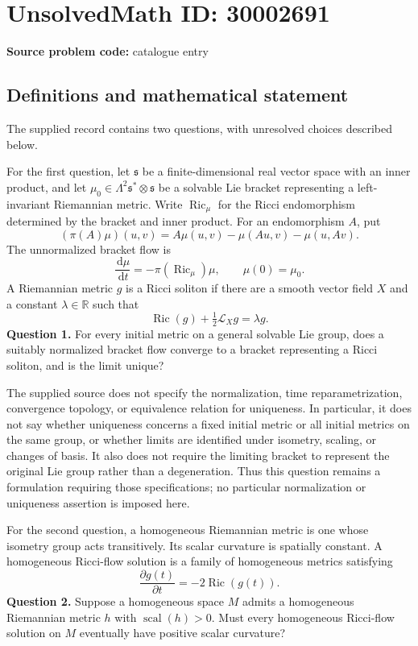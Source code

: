 \documentclass[11pt]{article}
\newcommand{\R}{\mathbb{R}}
\newcommand{\dd}{\,\mathrm{d}}
\begin{document}
\section*{UnsolvedMath ID: 30002691}
\textbf{Source problem code:} catalogue entry
\subsection{Definitions and mathematical statement}
The supplied record contains two questions, with unresolved choices described below.

For the first question, let \(\mathfrak{s}\) be a finite-dimensional real vector space with an inner product, and let \(\mu_0\in\Lambda^2\mathfrak{s}^*\otimes\mathfrak{s}\) be a solvable Lie bracket representing a left-invariant Riemannian metric. Write \(\operatorname{Ric}_{\mu}\) for the Ricci endomorphism determined by the bracket and inner product. For an endomorphism \(A\), put
\[
(\pi(A)\mu)(u,v)=A\mu(u,v)-\mu(Au,v)-\mu(u,Av).
\]
The unnormalized bracket flow is
\[
\frac{\dd\mu}{\dd t}=-\pi(\operatorname{Ric}_{\mu})\mu,
\qquad \mu(0)=\mu_0.
\]
A Riemannian metric \(g\) is a Ricci soliton if there are a smooth vector field \(X\) and a constant \(\lambda\in\R\) such that
\[
\operatorname{Ric}(g)+\tfrac12\mathcal L_Xg=\lambda g.
\]
\textbf{Question 1.} For every initial metric on a general solvable Lie group, does a suitably normalized bracket flow converge to a bracket representing a Ricci soliton, and is the limit unique?

The supplied source does not specify the normalization, time reparametrization, convergence topology, or equivalence relation for uniqueness. In particular, it does not say whether uniqueness concerns a fixed initial metric or all initial metrics on the same group, or whether limits are identified under isometry, scaling, or changes of basis. It also does not require the limiting bracket to represent the original Lie group rather than a degeneration. Thus this question remains a formulation requiring those specifications; no particular normalization or uniqueness assertion is imposed here.

For the second question, a homogeneous Riemannian metric is one whose isometry group acts transitively. Its scalar curvature is spatially constant. A homogeneous Ricci-flow solution is a family of homogeneous metrics satisfying
\[
\frac{\partial g(t)}{\partial t}=-2\operatorname{Ric}(g(t)).
\]
\textbf{Question 2.} Suppose a homogeneous space \(M\) admits a homogeneous Riemannian metric \(h\) with \(\operatorname{scal}(h)>0\). Must every homogeneous Ricci-flow solution on \(M\) eventually have positive scalar curvature?
\end{document}
